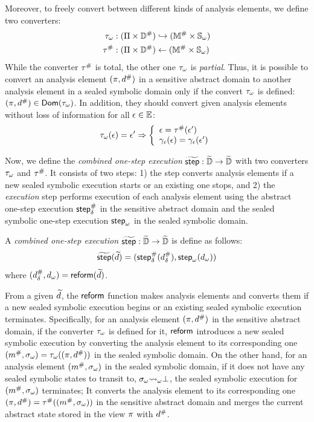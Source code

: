 Moreover, to freely convert between different kinds of analysis elements, we define two converters:
\begin{align}
  {\tau}_\omega & : (\Pi \times {\mathbb{D}}^{\#}) \hookrightarrow
    ({\mathbb{M}}^{\#} \times {\mathbb{S}}_\omega)\\
  {\tau}^{\#} & : (\Pi \times
    {\mathbb{D}}^{\#}) \leftarrow ({\mathbb{M}}^{\#} \times {\mathbb{S}}_\omega)
\end{align}
While the converter ${\tau}^{\#}$ is total, the other one ${\tau}_\omega$ is
\textit{partial}. Thus, it is possible to convert an analysis element
$(\pi, {d}^{\#})$ in a sensitive abstract domain to another analysis element in
a sealed symbolic domain only if the convert ${\tau}_\omega$ is defined: $(\pi,
{d}^{\#}) \in \textsf{Dom}({\tau}_\omega)$.  In addition, they should convert given
analysis elements without loss of information for all $\epsilon \in \mathbb{E}$:
\[
  {\tau}_\omega(\epsilon) = \epsilon' \Rightarrow \left\{
  \begin{array}{l}
    \epsilon = {\tau}^{\#}(\epsilon')\\
    \gamma_{\epsilon}(\epsilon) = \gamma_{\epsilon}(\epsilon')\\
  \end{array}
  \right.
\]

Now, we define the \textit{combined one-step execution} $\widetilde{\textsf{step}}: \widetilde{\mathbb{D}}
\rightarrow \widetilde{\mathbb{D}}$ with two converters ${\tau}_\omega$ and ${\tau}^{\#}$.
It consists of two steps: 1) the \textit{\triagename} step converts
analysis elements if a new sealed symbolic execution starts or an
existing one stops, and 2) the \textit{execution} step performs execution of each
analysis element using the abstract one-step execution ${\textsf{step}}^{\#}_\delta$ in the sensitive
abstract domain and the sealed symbolic one-step execution ${\textsf{step}}_\omega$ in the sealed
symbolic domain.
\begin{definition}
A \textit{combined one-step execution} $\widetilde{\textsf{step}}: \widetilde{\mathbb{D}} \rightarrow
\widetilde{\mathbb{D}}$ is define as follows:
  \[
    \widetilde{\textsf{step}}(\widetilde{d}) = ({\textsf{step}}^{\#}_\delta({{d}^{\#}_\delta}), {\textsf{step}}_\omega({{d}_\omega}))
  \]
where $({{d}^{\#}_\delta}, {{d}_\omega}) = \textsf{reform}(\widetilde{d})$.
\end{definition}

From a given $\widetilde{d}$, the $\textsf{reform}$ function makes analysis elements
and converts them if a new sealed symbolic execution
begins or an existing sealed symbolic execution terminates.
Specifically, for an analysis element $(\pi, {d}^{\#})$ in the sensitive abstract domain,
if the converter ${\tau}_\omega$ is defined for it, $\textsf{reform}$ introduces a new sealed symbolic execution
by converting the analysis element to its corresponding one $({m}^{\#}, {\sigma}_\omega) =
{\tau}_\omega((\pi, {d}^{\#}))$ in the sealed symbolic domain.
On the other hand, for an analysis element $({m}^{\#}, {\sigma}_\omega)$ in the sealed symbolic domain,
if it does not have any sealed symbolic states to transit to, ${\sigma}_\omega {\leadsto}_\omega \bot$,
the sealed symbolic execution for $({m}^{\#}, {\sigma}_\omega)$ terminates;
It converts the analysis element to its corresponding one $(\pi, {d}^{\#}) =
{\tau}^{\#}(({m}^{\#}, {\sigma}_\omega))$ in the sensitive abstract domain and
merges the current abstract state stored in the view $\pi$ with ${d}^{\#}$.

